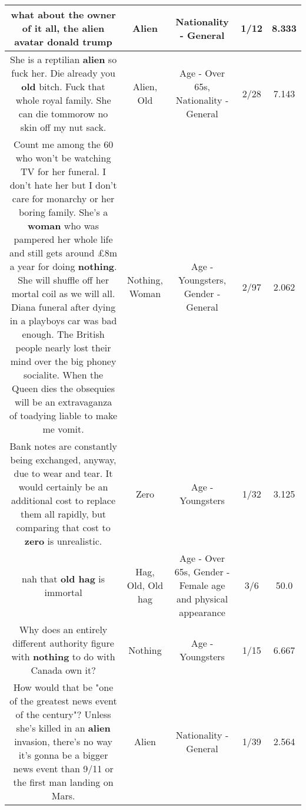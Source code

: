 \documentclass[11pt]{article}
\newlength\mylength
\begin{document}
\begin{center}
\begin{longtable}{|C{.65\mylength}|C{.30\mylength}|C{.12\mylength}|C{.12\mylength}|C{.12\mylength}|}
  \small what about the owner of it all, the \textbf{alien} avatar donald trump\normalsize   & Alien & Nationality - General & 1/12 & 8.333 \\  \hline
  \small She is a reptilian \textbf{alien} so fuck her. Die already you \textbf{old} bitch. Fuck that whole royal family. She can die tommorow no skin off my nut sack.\normalsize   & Alien, Old & Age - Over 65s, Nationality - General & 2/28 & 7.143 \\  \hline
  \small Count me among the 60 who won't be watching TV for her funeral. I don't hate her but I don't care for monarchy or her boring family. She's a \textbf{woman} who was pampered her whole life and still gets around £8m a year for doing \textbf{nothing}. She will shuffle off her mortal coil as we will all. Diana funeral after dying in a playboys car was bad enough. The British people nearly lost their mind over the big phoney socialite. When the Queen dies the obsequies will be an extravaganza of toadying liable to make me vomit.\normalsize   & Nothing, Woman & Age - Youngsters, Gender - General & 2/97 & 2.062 \\  \hline
  \small Bank notes are constantly being exchanged, anyway, due to wear and tear. It would certainly be an additional cost to replace them all rapidly, but comparing that cost to \textbf{zero} is unrealistic.\normalsize   & Zero & Age - Youngsters & 1/32 & 3.125 \\  \hline
  \small nah that \textbf{o\textbf{ld} h\textbf{ag}} is immortal\normalsize   & Hag, Old, Old hag & Age - Over 65s, Gender - Female age and physical appearance & 3/6 & 50.0 \\  \hline
  \small Why does an entirely different authority figure with \textbf{nothing} to do with Canada own it?\normalsize   & Nothing & Age - Youngsters & 1/15 & 6.667 \\  \hline
  \small How would that be "one of the greatest news event of the century"? Unless she's killed in an \textbf{alien} invasion, there's no way it's gonna be a bigger news event than 9/11 or the first man landing on Mars.\normalsize   & Alien & Nationality - General & 1/39 & 2.564 \\  \hline

\end{longtable}
\end{center}
\end{document}
